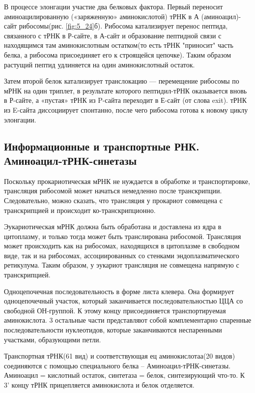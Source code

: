 В процессе элонгации участие два белковых фактора. Первый переносит аминоацилированную («заряженную» аминокислотой) тРНК в А (аминоацил)-сайт рибосомы(рис. \ref{fig:5_24}б). Рибосома катализирует перенос пептида, связанного с тРНК в Р-сайте, в А-сайт и образование пептидной связи с находящимся там аминокислотным остатком(то есть тРНК "приносит" часть белка, а рибосома присоединяет его к строящейся цепочке). Таким образом растущий пептид удлиняется на один аминокислотный остаток. 

Затем второй белок катализирует транслокацию — перемещение рибосомы по мРНК на один триплет, в результате которого пептидил-тРНК оказывается вновь в Р-сайте, а «пустая» тРНК из P-сайта переходит в Е-сайт (от слова exit). тРНК из E-сайта диссоциирует спонтанно, после чего рибосома готова к новому циклу элонгации.

\subsection{Информационные и транспортные РНК. Аминоацил-тРНК-синетазы}

Поскольку прокариотическая мРНК не нуждается в обработке и транспортировке, трансляция рибосомой может начаться немедленно после транскрипции. Следовательно, можно сказать, что трансляция у прокариот совмещена с транскрипцией и происходит ко-транскрипционно.

Эукариотическая мРНК должна быть обработана и доставлена из ядра в цитоплазму, и только тогда может быть транслирована рибосомой. Трансляция может происходить как на рибосомах, находящихся в цитоплазме в свободном виде, так и на рибосомах, ассоциированных со стенками эндоплазматического ретикулума. Таким образом, у эукариот трансляция не совмещена напрямую с транскрипцией. 

Одноцепочечная последовательность в форме листа клевера. Она формирует одноцепочечный участок, который заканчивается последовательностью ЦЦА со свободной ОН-группой. К этому концу присоединяется транспортируемая аминокислота. 3 остальные части представляют собой комплементарно спаренные последовательности нуклеотидов, которые заканчиваются неспаренными участками, образующими петли.

Транспортная тРНК(61 вид) и соответствующая ец аминокислотаа(20 видов) соединяются с помощью специального белка -- Аминоацил-тРНК-синетазы. Аминоацил = кислотный остаток, синтетаза = белок, синтезирующий что-то. К 3' концу тРНК прицепляется аминокислота и белок отделяется.

